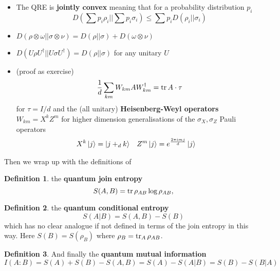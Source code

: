 \documentclass{article}
\newtheorem{lemma}{Lemma}
\theoremstyle{definition}
\newtheorem{definition}{Definition}
\begin{document}
\begin{itemize}
\begin{lemma}
\begin{equation}
        D(\Lambda(\rho) || \Lambda(\sigma)) \leq D(\rho || \sigma)
      \end{equation}
    \end{lemma}
  \item The QRE is \textbf{jointly convex} meaning that for a probability 
    distribution $p_i$
    \begin{equation}
      D(\sum p_i \rho_i || \sum p_i \sigma_i) \leq \sum p_i D(\rho_i ||
      \sigma_i)
    \end{equation}
  \item $D(\rho \otimes \omega || \sigma \otimes \nu) = D(\rho || \sigma) +
    D(\omega \otimes \nu)$
  \item $D(U\rho U^\dagger || U\sigma U^\dagger) = D(\rho || \sigma)$ for any
    unitary $U$
  \item (proof as exercise) 
    \begin{equation}
      \frac{1}{d} \sum_{km} W_{km} A W_{km}^\dagger = \tr A\cdot \tau
    \end{equation}
    for $\tau = I / d$ and the (all unitary) \textbf{Heisenberg-Weyl operators}
    $W_{km} = X^k Z^m$ for higher dimension generalisations of the $\sigma_X,
    \sigma_Z$ Pauli operators
    \begin{align}
      X^k \ket{j} &= \ket{j +_d k}  & Z^m\ket{j} &= e^{\frac{2\pi i mj}{d}}
      \ket{j}
    \end{align}
\end{itemize}

Then we wrap up with the definitions of
\begin{definition}
  the \textbf{quantum join entropy}
  \begin{equation}
    S(A, B) = \tr \rho_{AB} \log \rho_{AB},
  \end{equation}
\end{definition}
\begin{definition}
  the \textbf{quantum conditional entropy}
  \begin{equation}
    S(A | B) = S(A, B) - S(B)
  \end{equation}
  which has no clear analogue if not defined in terms of the join entropy in 
  this way. Here $S(B) = S(\rho_B)$ where $\rho_B = \tr_A \rho_{AB}$.
\end{definition}
\begin{definition}
  And finally the \textbf{quantum mutual information}
  \begin{equation}
    I(A : B) = S(A) + S(B) - S(A, B) = S(A) - S(A | B) = S(B) - S(B | A)
  \end{equation}
\end{definition}
\end{document}
